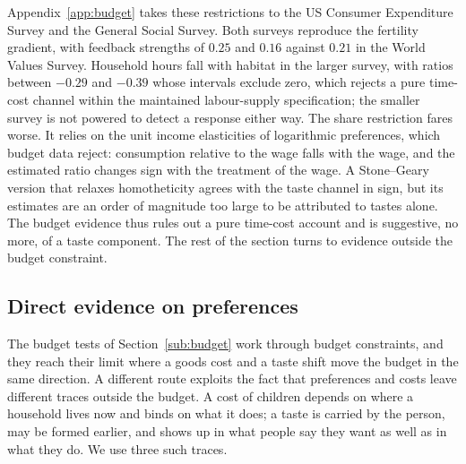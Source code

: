 \documentclass[11pt]{article}
\begin{document}
Appendix~\ref{app:budget} takes these restrictions to the US Consumer Expenditure Survey and the General
Social Survey. Both surveys reproduce the fertility gradient, with feedback strengths of $0.25$ and
$0.16$ against $0.21$ in the World Values Survey. Household hours fall with habitat in the larger survey,
with ratios between $-0.29$ and $-0.39$ whose intervals exclude zero, which rejects a pure time-cost
channel within the maintained labour-supply specification; the smaller survey is not powered to detect
a response either way. The share restriction fares worse. It relies on the unit income elasticities of
logarithmic preferences, which budget data reject: consumption relative to the wage falls with the wage,
and the estimated ratio changes sign with the treatment of the wage. A Stone--Geary version that relaxes
homotheticity agrees with the taste channel in sign, but its estimates are an order of magnitude too
large to be attributed to tastes alone. The budget evidence thus rules out a pure time-cost account and
is suggestive, no more, of a taste component. The rest of the section turns to evidence outside the
budget constraint.

\subsection{Direct evidence on preferences}
\label{sub:prefs}

The budget tests of Section~\ref{sub:budget} work through budget constraints, and they reach their limit
where a goods cost and a taste shift move the budget in the same direction. A different route
exploits the fact that preferences and costs leave different traces outside the budget. A cost of
children depends on where a household lives now and binds on what it does; a taste is carried by
the person, may be formed earlier, and shows up in what people say they want as well as in what
they do. We use three such traces.
\end{document}
